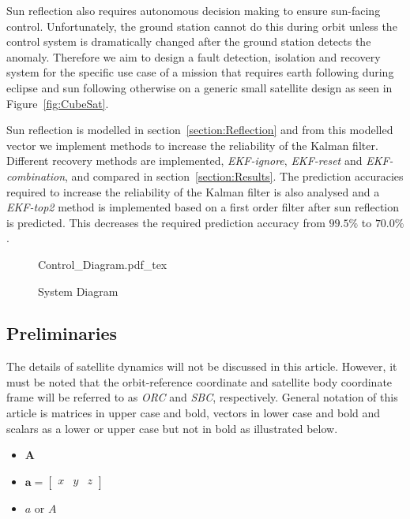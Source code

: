 \documentclass[letterpaper, 10 pt, conference]{ieeeconf}  %
\begin{document}
Sun reflection also requires autonomous decision making to ensure sun-facing control. Unfortunately, the ground station cannot do this during orbit unless the control system is dramatically changed after the ground station detects the anomaly. Therefore we aim to design a fault detection, isolation and recovery system for the specific use case of a mission that requires earth following during eclipse and sun following otherwise on a generic small satellite design as seen in Figure~\ref{fig:CubeSat}.

Sun reflection is modelled in section~\ref{section:Reflection} and from this modelled vector we implement methods to increase the reliability of the Kalman filter. Different recovery methods are implemented, \emph{EKF-ignore}, \emph{EKF-reset} and \emph{EKF-combination}, and compared in section~\ref{section:Results}. The prediction accuracies required to increase the reliability of the Kalman filter is also analysed and a \emph{EKF-top2} method is implemented based on a first order filter after sun reflection is predicted. This decreases the required prediction accuracy from $99.5\%$ to $70.0\%$.


\begin{figure}[h!b!t]
	\centering
	\def\svgwidth{14cm}
	{Control_Diagram.pdf_tex}
	\caption{System Diagram}
	\label{fig:System_Diagram}
\end{figure}


\subsection{Preliminaries}
The details of satellite dynamics will not be discussed in this article. However, it must be noted that the orbit-reference coordinate and satellite body coordinate frame will be referred to as \emph{ORC} and \emph{SBC}, respectively. General notation of this article is matrices in upper case and bold, vectors in lower case and bold and scalars as a lower or upper case but not in bold as illustrated below.
\begin{itemize}
	\item{ $\mathbf{A}$}
	\item{ $\mathbf{a} = \begin{bmatrix} 
		x & y & z
		\end{bmatrix}$}
	\item{ $a$ or $A$}
\end{itemize}
\end{document}
